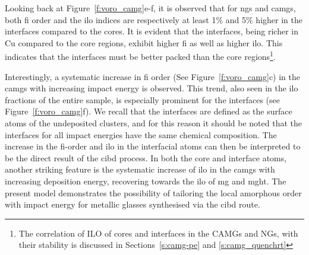 \begin{changebar}
Looking back at Figure~\ref{f:voro_camg}e-f, it is observed that for \gls{ng}s and \gls{camg}s, both \gls{fi} order and the \gls{ilo} indices are respectively at least 1\% and 5\% higher in the interfaces compared to the cores. It is evident that the interfaces, being richer in Cu compared to the core regions, exhibit higher \gls{fi} as well as higher \gls{ilo}. This indicates that the interfaces must be better packed than the core regions\footnote{The correlation of ILO of cores and interfaces in the CAMGs and NGs, with their stability is discussed in Sections~\ref{s:camg-pe} and \ref{s:camg_quenchrt}}. \par

Interestingly, a systematic increase in \gls{fi} order (See Figure~\ref{f:voro_camg}c) in the \gls{camg}s with increasing impact energy is observed. This trend, also seen in the \gls{ilo} fractions of the entire sample, is especially prominent for the interfaces (see Figure~\ref{f:voro_camg}f). We recall that the interfaces are defined as the surface atoms of the undeposited clusters, and for this reason it should be noted that the interfaces for all impact energies have the same chemical composition. The increase in the \gls{fi}-order and \gls{ilo} in the interfacial atoms can then be interpreted to be the direct result of the \gls{cibd} process. In both the core and interface atoms, another striking feature is the systematic increase of \gls{ilo} in the \gls{camg}s with increasing deposition energy, recovering towards the \gls{ilo} of \gls{mg} and \gls{mght}. The present model demonstrates the possibility of tailoring the local amorphous order with impact energy for metallic glasses synthesised via the \gls{cibd} route.
\end{changebar}

%
